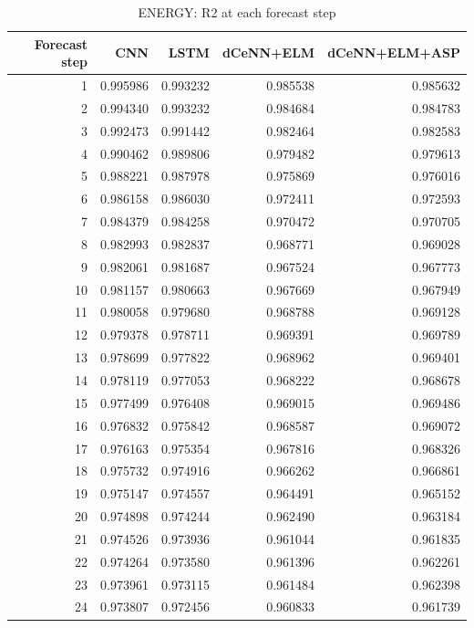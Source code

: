 \begin{table}
\caption{ENERGY: R2 at each forecast step}
\begin{tabular}{rrrrr}
\toprule
Forecast step & CNN & LSTM & dCeNN+ELM & dCeNN+ELM+ASP \\
\midrule
1 & 0.995986 & 0.993232 & 0.985538 & 0.985632 \\
2 & 0.994340 & 0.993232 & 0.984684 & 0.984783 \\
3 & 0.992473 & 0.991442 & 0.982464 & 0.982583 \\
4 & 0.990462 & 0.989806 & 0.979482 & 0.979613 \\
5 & 0.988221 & 0.987978 & 0.975869 & 0.976016 \\
6 & 0.986158 & 0.986030 & 0.972411 & 0.972593 \\
7 & 0.984379 & 0.984258 & 0.970472 & 0.970705 \\
8 & 0.982993 & 0.982837 & 0.968771 & 0.969028 \\
9 & 0.982061 & 0.981687 & 0.967524 & 0.967773 \\
10 & 0.981157 & 0.980663 & 0.967669 & 0.967949 \\
11 & 0.980058 & 0.979680 & 0.968788 & 0.969128 \\
12 & 0.979378 & 0.978711 & 0.969391 & 0.969789 \\
13 & 0.978699 & 0.977822 & 0.968962 & 0.969401 \\
14 & 0.978119 & 0.977053 & 0.968222 & 0.968678 \\
15 & 0.977499 & 0.976408 & 0.969015 & 0.969486 \\
16 & 0.976832 & 0.975842 & 0.968587 & 0.969072 \\
17 & 0.976163 & 0.975354 & 0.967816 & 0.968326 \\
18 & 0.975732 & 0.974916 & 0.966262 & 0.966861 \\
19 & 0.975147 & 0.974557 & 0.964491 & 0.965152 \\
20 & 0.974898 & 0.974244 & 0.962490 & 0.963184 \\
21 & 0.974526 & 0.973936 & 0.961044 & 0.961835 \\
22 & 0.974264 & 0.973580 & 0.961396 & 0.962261 \\
23 & 0.973961 & 0.973115 & 0.961484 & 0.962398 \\
24 & 0.973807 & 0.972456 & 0.960833 & 0.961739 \\
\bottomrule
\end{tabular}
\end{table}
